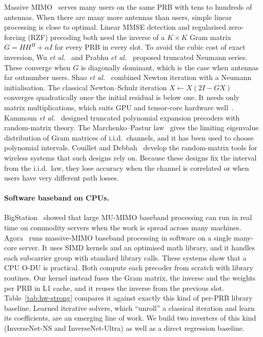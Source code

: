 Massive MIMO~\cite{marzetta2010,rusek2013} serves many users on the same PRB with tens to hundreds of antennas. When there are many more antennas than users, simple linear processing is close to optimal. Linear MMSE detection and regularised zero-forcing (RZF) precoding both need the inverse of a $K\times K$ Gram matrix $G = HH^H + \alpha I$ for every PRB in every slot. To avoid the cubic cost of exact inversion, Wu \emph{et al.}~\cite{wu2013} and Prabhu \emph{et al.}~\cite{prabhu2013} proposed truncated Neumann series. These converge when $G$ is diagonally dominant, which is the case when antennas far outnumber users. Shao \emph{et al.}~\cite{shao2016} combined Newton iteration with a Neumann initialisation. The classical Newton--Schulz iteration $X \leftarrow X(2I - GX)$~\cite{schulz1933,benisrael1966,pan1991} converges quadratically once the initial residual is below one. It needs only matrix multiplications, which suits GPU and tensor-core hardware well~\cite{higham2008}. Kammoun \emph{et al.}~\cite{kammoun2014} designed truncated polynomial expansion precoders with random-matrix theory. The Marchenko--Pastur law~\cite{marchenko1967} gives the limiting eigenvalue distribution of Gram matrices of i.i.d.\ channels, and it has been used to choose polynomial intervals. Couillet and Debbah~\cite{couillet2011} develop the random-matrix tools for wireless systems that such designs rely on. Because these designs fix the interval from the i.i.d.\ law, they lose accuracy when the channel is correlated or when users have very different path losses.

\paragraph{Software baseband on CPUs.} BigStation~\cite{yang2013bigstation} showed that large MU-MIMO baseband processing can run in real time on commodity servers when the work is spread across many machines. Agora~\cite{ding2020agora} runs massive-MIMO baseband processing in software on a single many-core server. It uses SIMD kernels and an optimised math library, and it handles each subcarrier group with standard library calls. These systems show that a CPU O-DU is practical. Both compute each precoder from scratch with library routines. Our kernel instead fuses the Gram matrix, the inverse and the weights per PRB in L1 cache, and it reuses the inverse from the previous slot. Table~\ref{tab:hw-strong} compares it against exactly this kind of per-PRB library baseline. Learned iterative solvers, which ``unroll'' a classical iteration and learn its coefficients, are an emerging line of work. We build two inverters of this kind (InverseNet-NS and InverseNet-Ultra) as well as a direct regression baseline.

